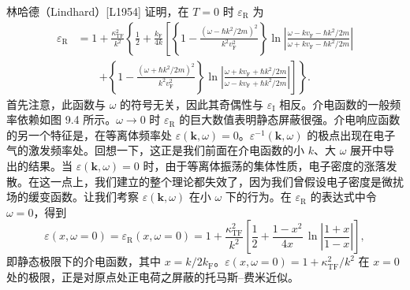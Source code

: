 林哈德（Lindhard）[L1954] 证明，在 $T=0$ 时 $\varepsilon_{\mathrm{R}}$ 为
\begin{equation*}
\begin{aligned}
\varepsilon_{\mathrm{R}}&=1+\frac{\kappa_{\mathrm{TF}}^2}{k^2}\left\{\frac{1}{2}+\frac{k_{\mathrm{F}}}{4k}\left[\left\{1-\frac{\left(\omega-\hbar k^2/2m\right)^2}{k^2v_{\mathrm{F}}^2}\right\}\ln\left|\frac{\omega-kv_{\mathrm{F}}-\hbar k^2/2m}{\omega+kv_{\mathrm{F}}-\hbar k^2/2m}\right|\right.\right.\\
&\qquad\left.\left.+\left\{1-\frac{\left(\omega+\hbar k^2/2m\right)^2}{k^2v_{\mathrm{F}}^2}\right\}\ln\left|\frac{\omega+kv_{\mathrm{F}}+\hbar k^2/2m}{\omega-kv_{\mathrm{F}}+\hbar k^2/2m}\right|\right]\right\}.
\end{aligned}\tag{9.122}
\end{equation*}
首先注意，此函数与 $\omega$ 的符号无关，因此其奇偶性与 $\varepsilon_{\mathrm{I}}$ 相反。介电函数的一般频率依赖如图 9.4 所示。$\omega\to 0$ 时 $\varepsilon_{\mathrm{R}}$ 的巨大数值表明静态屏蔽很强。介电响应函数的另一个特征是，在等离体频率处 $\varepsilon(\mathbf{k},\omega)=0$。$\varepsilon^{-1}(\mathbf{k},\omega)$ 的极点出现在电子气的激发频率处。回想一下，这正是我们前面在介电函数的小 $k$、大 $\omega$ 展开中导出的结果。当 $\varepsilon(\mathbf{k},\omega)=0$ 时，由于等离体振荡的集体性质，电子密度的涨落发散。在这一点上，我们建立的整个理论都失效了，因为我们曾假设电子密度是微扰场的缓变函数。让我们考察 $\varepsilon(\mathbf{k},\omega)$ 在小 $\omega$ 下的行为。在 $\varepsilon_{\mathrm{R}}$ 的表达式中令 $\omega=0$，得到
\begin{equation*}
\varepsilon(x,\omega=0)=\varepsilon_{\mathrm{R}}(x,\omega=0)=1+\frac{\kappa_{\mathrm{TF}}^2}{k^2}\left[\frac{1}{2}+\frac{1-x^2}{4x}\,\ln\left|\frac{1+x}{1-x}\right|\right],\tag{9.123}
\end{equation*}
即静态极限下的介电函数，其中 $x=k/2k_{\mathrm{F}}$。$\varepsilon(x,\omega=0)=1+\kappa_{\mathrm{TF}}^2/k^2$ 在 $x=0$ 处的极限，正是对原点处正电荷之屏蔽的托马斯–费米近似。

